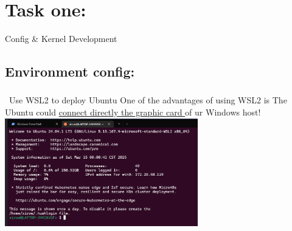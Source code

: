 \section{\LARGE Task one:}
\begin{IEEEkeywords}
    Config \& Kernel Development
\end{IEEEkeywords}
\vspace{-0.3cm}
\subsection{Environment config:}
\subsubsection{}~Use WSL2 to deploy Ubuntu\newline
One of the advantages of using WSL2 is The Ubuntu could \underline {connect directly the graphic card }
of ur Windows host! \newline
\newline \includegraphics[width=3.3in]{photograph/ubuntu}\newline


